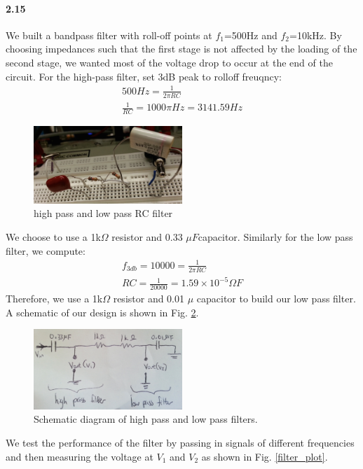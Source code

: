 \documentclass[authoryear, 12pt,5p, times]{elsarticle}
\begin{document}
\paragraph{\textbf{2.15}}
We built a bandpass filter with roll-off points at $f_1$=500Hz and $f_2$=10kHz. By choosing impedances such that the first stage is not affected by the loading of the second stage, we wanted most of the voltage drop to occur at the end of the circuit. For the high-pass filter, set 3dB peak to rolloff freuqncy: 
\begin{align*}
500Hz = \frac{1}{2\pi RC}
\\
\frac{1}{RC}=1000\pi Hz = 3141.59Hz
\end{align*}\begin{figure}[h!]
\includegraphics[width=0.5\textwidth]{figure/filter}
\caption{high pass and low pass RC filter}
\label{filter}
\end{figure}
We choose to use a 1k$\Omega$ resistor and 0.33 $\mu F $capacitor. Similarly for the low pass filter, we compute:
\begin{align*}
f_{3db}=10000= \frac{1}{2\pi RC}
\\RC = \frac{1}{20000}=1.59\times10^{-5} \Omega F
\end{align*}
Therefore, we use a 1k$\Omega$ resistor and 0.01 $\mu$ capacitor to build our low pass filter. A schematic of our design is shown in Fig. \ref{schema}.
\begin{figure}[h!]
\includegraphics[width=0.5\textwidth]{figure/schema}
\caption{Schematic diagram of high pass and low pass filters.}
\label{schema}
\end{figure}
We test the performance of the filter by passing in signals of different frequencies and then measuring the voltage at $V_1$ and $V_2$ as shown in Fig. \ref{filter_plot}.
\end{document}
